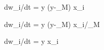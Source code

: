 \documentclass[11pt]{article}
\begin{document}
\beqn
dw_i/dt = \eta y (y-\theta_M) x_i
\eeqn

\beqn
dw_i/dt = \eta y (y-\theta_M) x_i/\theta_M
\eeqn

\beqn
dw_i/dt = \eta y x_i
\eeqn
\end{document}
